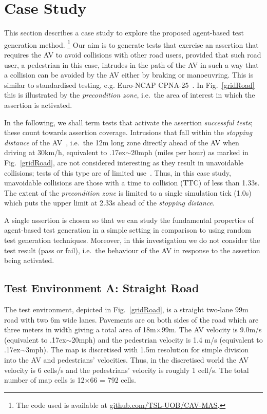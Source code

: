 \documentclass[letterpaper, 10 pt, journal, twoside]{IEEEtran}
\begin{document}
\section{Case Study} \label{s:case-study}
 
This section describes a case study to explore the proposed agent-based test generation method.%
\footnote{The code used is available at \url{github.com/TSL-UOB/CAV-MAS}.} Our aim is to generate tests that exercise an assertion that requires the AV to avoid collisions with other road users, provided that such road user, a pedestrian in this case, intrudes in the path of the AV in such a way that a collision can be avoided by the AV either by braking or manoeuvring. This is similar to standardised testing, e.g. Euro-NCAP CPNA-25~\cite{EURO-NCAP}. In Fig.~\ref{gridRoad} this is illustrated by the \textit{precondition zone}, i.e.\ the area of interest in which the assertion is activated.

In the following, we shall term tests that activate the assertion \textit{successful tests}; these count towards assertion coverage. Intrusions that fall within the \textit{stopping distance} of the AV~\cite{codes2015highway}, i.e.\ the 12m long zone directly ahead of the AV when driving at 30km/h, equivalent to {\raise.17ex\hbox{$\scriptstyle\sim$}}20mph (miles per hour) as marked in Fig.~\ref{gridRoad}, are not considered interesting as they result in unavoidable collisions; tests of this type are of limited use~\cite{Tuncali2018}. Thus, in this case study, unavoidable collisions are those with a time to collision (TTC) of less than 1.33s. The extent of the \textit{precondition zone} is limited to a single simulation tick (1.0s) which puts the upper limit at 2.33s ahead of the \textit{stopping distance}.%

A single assertion is chosen so that we can study the fundamental properties of agent-based test generation in a simple setting in comparison to using random test generation techniques. Moreover, in this investigation we do not consider the test result (pass or fail), i.e.\ the behaviour of the AV in response to the assertion being activated. 

\subsection{Test Environment A: Straight Road}
The test environment, depicted in Fig.~\ref{gridRoad}, is a straight two-lane 99m road with two 6m wide lanes. Pavements are on both sides of the road which are three meters in width giving a total area of 18m$\times$99m. The AV velocity is 9.0m/s (equivalent to {\raise.17ex\hbox{$\scriptstyle\sim$}}20mph) and the pedestrian velocity is 1.4 m/s (equivalent to {\raise.17ex\hbox{$\scriptstyle\sim$}}3mph). The map is discretised with 1.5m resolution for simple division into the AV and pedestrians' velocities. Thus, in the discretised world the AV velocity is 6 cells/s and the pedestrians' velocity is roughly 1 cell/s. The total number of map cells is 12$\times$66 = 792 cells. 
\end{document}
